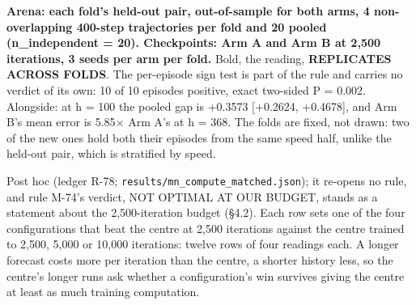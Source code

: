 \documentclass[10pt]{article}
\begin{document}
\begin{center}\small{}\end{center}

\textbf{Arena: each fold's held-out pair, out-of-sample for both arms, 4 non-overlapping 400-step trajectories per fold and 20 pooled (n\_independent = 20). Checkpoints: Arm A and Arm B at 2,500 iterations, 3 seeds per arm per fold.} Bold, the reading, \textbf{REPLICATES ACROSS FOLDS}. The per-episode sign test is part of the rule and carries no verdict of its own: 10 of 10 episodes positive, exact two-sided P = 0.002. Alongside: at h = 100 the pooled gap is +0.3573 [+0.2624, +0.4678], and Arm B's mean error is 5.85$\times$ Arm A's at h = 368. The folds are fixed, not drawn: two of the new ones hold both their episodes from the same speed half, unlike the held-out pair, which is stratified by speed.


Post hoc (ledger R-78; \texttt{results/\allowbreak{}mn\_\allowbreak{}compute\_\allowbreak{}matched\allowbreak{}.json}); it re-opens no rule, and rule M-74's verdict, NOT OPTIMAL AT OUR BUDGET, stands as a statement about the 2,500-iteration budget (\S{}4.2). Each row sets one of the four configurations that beat the centre at 2,500 iterations against the centre trained to 2,500, 5,000 or 10,000 iterations: twelve rows of four readings each. A longer forecast costs more per iteration than the centre, a shorter history less, so the centre's longer runs ask whether a configuration's win survives giving the centre at least as much training computation.
\end{document}

